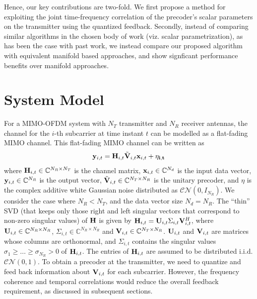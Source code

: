 \documentclass[journal,10pt,twocolumn]{IEEEtran}
\def\bx{{\bf x}}
\def\by{{\bf y}}
\def\bH{{\bf H}}
\def\bU{{\bf U}}
\def\bV{{\bf V}}
\begin{document}
Hence, our key contributions are two-fold.  We first propose a method for exploiting the
joint time-frequency correlation of the precoder's scalar parameters
on the transmitter using the quantized feedback.
Secondly, instead of comparing similar algorithms in the chosen body of work (viz. scalar parametrization), as has been the case with past work, we instead compare our proposed algorithm with equivalent manifold based approaches, and show signficant performance benefits over manifold approaches.



\section{System Model}
For a MIMO-OFDM system with $N_T$ transmitter and $N_R$ receiver
antennas, the channel for the $i$-th subcarrier at time instant $t$
can be modelled as a flat-fading MIMO channel. This flat-fading MIMO
channel can be written as
\label{section2}
\begin{equation}
\by_{i,t} = \bH_{i,t}\tilde{\bV}_{i,t} \bx_{i,t}+ \bf{\eta_{i,t}}
\end{equation}
where $\bH_{i,t} \in \mathbb{C}^{N_R \times N_T}$ is the channel
matrix, $\bx_{i,t} \in \mathbb{C}^{N_d}$ is the input data vector,
$\by_{i,t} \in \mathbb{C}^{N_R}$ is the output vector,
$\tilde{\bV}_{i,t} \in \mathbb{C}^{N_T \times N_R}$ is the unitary
precoder, and $\eta$ is the complex additive white Gaussian noise
distributed as ${\mathcal{CN}}(0,I_{N_R})$. We consider the case where
$N_R < N_T$, and the data vector size $N_d = N_R$.  The ``thin'' SVD
(that keeps only those right and left singular vectors that correspond
to non-zero singular values) of $\bH$ is given by
$\bH_{i,t} = \bU_{i,t} \Sigma_{i,t} \bV_{i,t}^{H}$, where
$\bU_{i,t} \in \mathbb{C}^{N_R \times N_R}$,
$\Sigma_{i,t} \in \mathbb{C}^{N_R \times N_R}$ and
$\bV_{i,t} \in \mathbb{C}^{N_T \times N_R}$. $\bU_{i,t}$ and
$\bV_{i,t}$ are matrices whose columns are orthonormal, and
$\Sigma_{i,t}$ contains the singular values
$\sigma_1 \geq \ldots \geq \sigma_{N_R} > 0$ of $\bH_{i,t}$. The
entries of $\bH_{i,t}$ are assumed to be distributed
i.i.d. $\mathcal{CN}(0,1)$. To obtain a precoder at the
transmitter, we need to quantize and feed back information about
$\bV_{i,t}$ for each subcarrier. However, the frequency coherence and
temporal correlations would reduce the overall feedback requirement,
as discussed in subsequent sections.
\end{document}
